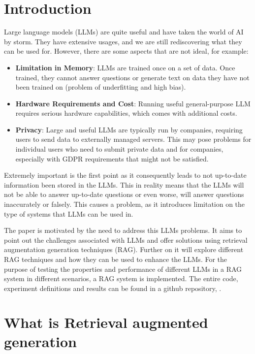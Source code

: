 \documentclass{wseas}
\begin{document}
\section{Introduction}

Large language models (LLMs) are quite useful and have taken the world of AI by storm. They have
extensive usages, and we are still rediscovering what they can be used
for. However, there are some aspects that are not ideal, for example:

\begin{itemize}

\item
  \textbf{Limitation in Memory}: LLMs are trained once on a set of data.
  Once trained, they cannot answer questions or generate text on data
  they have not been trained on (problem of underfitting and high
  bias).
\item
  \textbf{Hardware Requirements and Cost}: Running useful
  general-purpose LLM requires serious hardware capabilities, which
  comes with additional costs.
\item
  \textbf{Privacy}: Large and useful LLMs are typically run by
  companies, requiring users to send data to externally managed servers.
  This may pose problems for individual users who need to submit private
  data and for companies, especially with GDPR requirements that might
  not be satisfied.
\end{itemize}

Extremely important is the first point as it consequently leads to
not up-to-date information been stored in the LLMs. This in reality means that
the LLMs will not be able to answer up-to-date questions or even worse, will
answer questions inaccurately or falsely. This causes a problem, as it 
introduces limitation on the type of systems that LLMs can be used in.

The paper is motivated by the need to address this LLMs problems.
It aims to point out the challenges associated with LLMs and offer solutions
using retrieval augmentation generation techniques (RAG). 
Further on it will explore different RAG techniques and how they can be used  
to enhance the LLMs. For the purpose of testing the properties and performance 
of different LLMs in a RAG system in different scenarios, a RAG system is implemented. 
The entire code, experiment definitions and results can be found in a github repository,
\cite{cite_github_solution}.

\section{What is Retrieval augmented generation}
\end{document}
